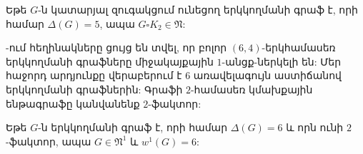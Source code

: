 \begin{corollary}
\label{c2_bipartite_Delta5_nopm} Եթե $G$-ն կատարյալ զուգակցում ունեցող երկկողմանի գրաֆ է, որի համար $\Delta(G)=5$, ապա $G \square K_2 \in \mathfrak{N}$:
\end{corollary}

\cite{CarlJToft}-ում հեղինակները ցույց են տվել, որ բոլոր $(6,4)$-երկհամասեռ երկկողմանի գրաֆները միջակայքային $1$-անցք-ներկելի են: Մեր հաջորդ արդյունքը վերաբերում է 6 առավելագույն աստիճանով երկկողմանի գրաֆներին: Գրաֆի $2$-համասեռ կմախքային ենթագրաֆը կանվանենք $2$-ֆակտոր:

\begin{theorem}
\label{t2_bipartite_Delta6_2factor} Եթե $G$-ն երկկողմանի գրաֆ է, որի համար $\Delta(G)=6$ և որն ունի 
$2$-ֆակտոր, ապա $G\in \mathfrak{N}^{1}$ և $w^{1}(G)=6$:
\end{theorem}
